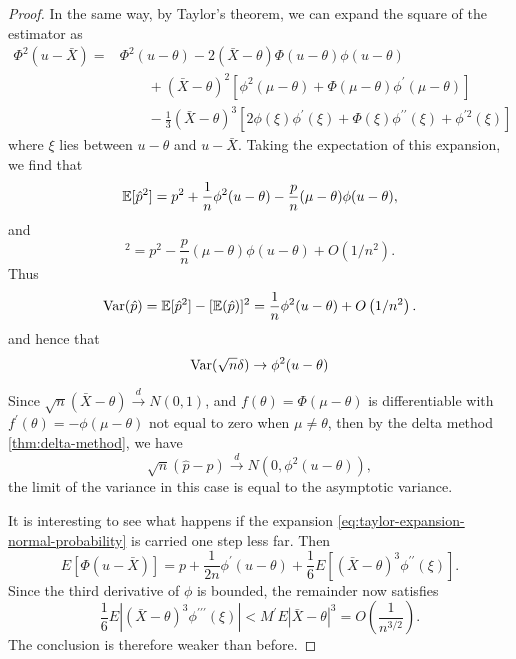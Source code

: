 \begin{proof}
	In the same way, by Taylor's theorem, we can expand the square of the estimator as
	\begin{equation*}
		\begin{aligned}
			\Phi^{2}(u-\bar{X})= & \Phi^{2}(u-\theta)-2(\bar{X}-\theta)\Phi(u-\theta)\phi(u-\theta)                                                                      \\
			                     & \qquad+(\bar{X}-\theta)^{2}\left[\phi^{2}(\mu-\theta)+\Phi(\mu-\theta)\phi^{\prime}(\mu-\theta)\right]                                \\
			                     & \qquad-\frac{1}{3}(\bar{X}-\theta)^{3}\left[2\phi(\xi)\phi^{\prime}(\xi)+\Phi(\xi)\phi^{\prime\prime}(\xi)+\phi^{\prime2}(\xi)\right]
		\end{aligned}
	\end{equation*}
	where $\xi$ lies between $u-\theta$ and $u-\bar{X}$. Taking the expectation of this expansion, we find that
	\begin{equation*}
		{\mathbb E}[\hat{p}^{2}]=p^{2}+\frac{1}{n}\phi^{2}(u-\theta)-\frac{p}{n}(\mu-\theta)\phi(u-\theta),
	\end{equation*}
	and
	\begin{equation*}
		[\bbE(\hat{p})]^{2}=p^{2}-\frac{p}{n}(\mu-\theta)\phi(u-\theta)+O\left(1/n^{2}\right).
	\end{equation*}
	Thus
	\begin{equation*}
		\mathrm{Var}(\hat{p})={\mathbb E}[\hat{p}^{2}]-[{\mathbb E}(\hat{p})]^{2}=\frac{1}{n}\phi^{2}(u-\theta)+O\left(1/n^{2}\right).
	\end{equation*}
	and hence that
	\begin{equation*}
		\mathrm{Var}(\sqrt{n} \delta) \rightarrow \phi^2(u-\theta)
	\end{equation*}

	Since $\sqrt{n}(\bar{X}-\theta) \stackrel{d}{\rightarrow} N\left(0,1\right)$, and $f(\theta)=\Phi(\mu-\theta)$ is differentiable with $f^{\prime}(\theta)=-\phi(\mu-\theta)$ not equal to zero when $\mu\neq\theta$, then by the delta method \eqref{thm:delta-method}, we have
	\begin{equation*}
		\sqrt{n}(\hat{p}-p)\stackrel{d}{\rightarrow}N\left(0,\phi^{2}(u-\theta)\right),
	\end{equation*}
	the limit of the variance in this case is equal to the asymptotic variance.

	It is interesting to see what happens if the expansion \eqref{eq:taylor-expansion-normal-probability} is carried one step less far. Then
	\begin{equation*}
		E[\Phi(u-\bar{X})]=p+\frac{1}{2 n} \phi^{\prime}(u-\theta)+\frac{1}{6} E\left[(\bar{X}-\theta)^3 \phi^{\prime \prime}(\xi)\right].
	\end{equation*}
	Since the third derivative of $\phi$ is bounded, the remainder now satisfies
	\begin{equation*}
		\frac{1}{6} E\left|(\bar{X}-\theta)^3 \phi^{\prime \prime \prime}(\xi)\right|<M^{\prime} E|\bar{X}-\theta|^3=O\left(\frac{1}{n^{3 / 2}}\right).
	\end{equation*}
	The conclusion is therefore weaker than before.
\end{proof}
